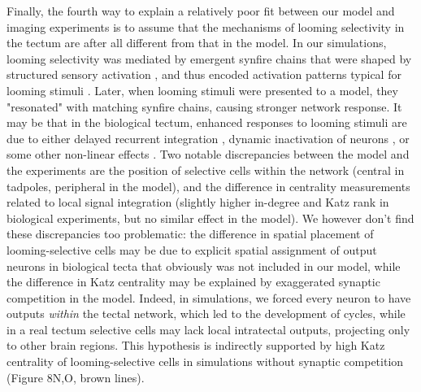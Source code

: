 \documentclass{article}
\begin{document}
Finally, the fourth way to explain a relatively poor fit between our model and imaging experiments is to assume that the mechanisms of looming selectivity in the tectum are after all different from that in the model. In our simulations, looming selectivity was mediated by emergent synfire chains \citep{cohen2002synreview, zheng2014synfire} that were shaped by structured sensory activation \citep{vislay2006rf, clopath2010stdpcoding}, and thus encoded activation patterns typical for looming stimuli \citep{pratt2008recurrent, richards2010stdp}. Later, when looming stimuli were presented to a model, they "resonated" with matching synfire chains, causing stronger network response. It may be that in the biological tectum, enhanced responses to looming stimuli are due to either delayed recurrent integration \citep{khakhalin2014, jang2016}, dynamic inactivation of neurons \citep{fotowat2011multiplexing}, or some other non-linear effects \citep{baginskas2009recurrent}. Two notable discrepancies between the model and the experiments are the position of selective cells within the network (central in tadpoles, peripheral in the model), and the difference in centrality measurements related to local signal integration (slightly higher in-degree and Katz rank in biological experiments, but no similar effect in the model). We however don't find these discrepancies too problematic: the difference in spatial placement of looming-selective cells may be due to explicit spatial assignment of output neurons in biological tecta that obviously was not included in our model, while the difference in Katz centrality may be explained by exaggerated synaptic competition in the model. Indeed, in simulations, we forced every neuron to have outputs \textit{within} the tectal network, which led to the development of cycles, while in a real tectum selective cells may lack local intratectal outputs, projecting only to other brain regions. This hypothesis is indirectly supported by high Katz centrality of looming-selective cells in simulations without synaptic competition (Figure 8N,O, brown lines).
\end{document}
